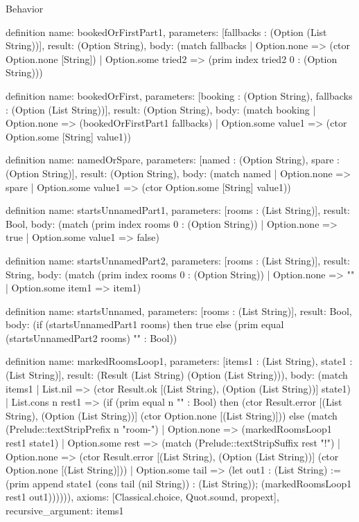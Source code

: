 \begin{lexlean}{Behavior}
\begin{semanticmodule}
definition{
  name: bookedOrFirstPart1,
  parameters: [fallbacks : (Option (List String))],
  result: (Option String),
  body: (match fallbacks
    | Option.none => (ctor Option.none [String])
    | Option.some tried2 => (prim index tried2 0 : (Option String)))
}

definition{
  name: bookedOrFirst,
  parameters: [booking : (Option String), fallbacks : (Option (List String))],
  result: (Option String),
  body: (match booking
    | Option.none => (bookedOrFirstPart1 fallbacks)
    | Option.some value1 => (ctor Option.some [String] value1))
}

definition{
  name: namedOrSpare,
  parameters: [named : (Option String), spare : (Option String)],
  result: (Option String),
  body: (match named
    | Option.none => spare
    | Option.some value1 => (ctor Option.some [String] value1))
}

definition{
  name: startsUnnamedPart1,
  parameters: [rooms : (List String)],
  result: Bool,
  body: (match (prim index rooms 0 : (Option String))
    | Option.none => true
    | Option.some value1 => false)
}

definition{
  name: startsUnnamedPart2,
  parameters: [rooms : (List String)],
  result: String,
  body: (match (prim index rooms 0 : (Option String))
    | Option.none => ""
    | Option.some item1 => item1)
}

definition{
  name: startsUnnamed,
  parameters: [rooms : (List String)],
  result: Bool,
  body: (if (startsUnnamedPart1 rooms) then true else (prim equal (startsUnnamedPart2 rooms) "" : Bool))
}

definition{
  name: markedRoomsLoop1,
  parameters: [items1 : (List String), state1 : (List String)],
  result: (Result (List String) (Option (List String))),
  body: (match items1
    | List.nil => (ctor Result.ok [(List String), (Option (List String))] state1)
    | List.cons n rest1 => (if (prim equal n "" : Bool) then (ctor Result.error [(List String), (Option (List String))] (ctor Option.none [(List String)])) else (match (Prelude::textStripPrefix n "room-")
      | Option.none => (markedRoomsLoop1 rest1 state1)
      | Option.some rest => (match (Prelude::textStripSuffix rest "!")
        | Option.none => (ctor Result.error [(List String), (Option (List String))] (ctor Option.none [(List String)]))
        | Option.some tail => (let out1 : (List String) := (prim append state1 (cons tail (nil String)) : (List String)); (markedRoomsLoop1 rest1 out1)))))),
  axioms: [Classical.choice, Quot.sound, propext],
  recursive_argument: items1
}


\end{semanticmodule}
\end{lexlean}
